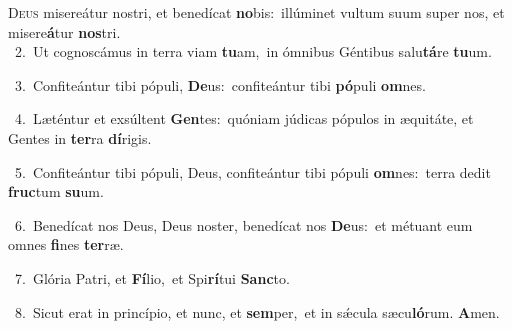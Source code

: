 \lettrine{\initial\textcolor{\initialcolor}{D}}{eus} misereátur nostri, et benedícat \textbf{no}\-bis:~\star illúminet vultum suum super nos, et misere\-\textbf{á}\-tur \textbf{nos}\-tri.\\
{\numbfont\textcolor{\numbcolor}{~2.}}~Ut cognoscámus in terra viam \textbf{tu}\-am,~\star in ómnibus Géntibus salu\-\textbf{tá}\-re \textbf{tu}\-um.\par
{\numbfont\textcolor{\numbcolor}{~3.}}~Confiteántur tibi pópuli, \textbf{De}\-us:~\star confiteántur tibi \textbf{pó}\-puli \textbf{om}\-nes.\par
{\numbfont\textcolor{\numbcolor}{~4.}}~Læténtur et exsúltent \textbf{Gen}\-tes:~\star quóniam júdicas pópulos in æquitáte, et Gentes in \textbf{ter}\-ra \textbf{dí}\-rigis.\par
{\numbfont\textcolor{\numbcolor}{~5.}}~Confiteántur tibi pópuli, Deus, confiteántur tibi pópuli \textbf{om}\-nes:~\star terra dedit \textbf{fruc}\-tum \textbf{su}\-um.\par
{\numbfont\textcolor{\numbcolor}{~6.}}~Benedícat nos Deus, Deus noster, benedícat nos \textbf{De}\-us:~\star et métuant eum omnes \textbf{fi}\-nes \textbf{ter}\-ræ.\par
{\numbfont\textcolor{\numbcolor}{~7.}}~Glória Patri, et \textbf{Fí}\-lio,~\star et Spi\-\textbf{rí}\-tui \textbf{Sanc}\-to.\par
{\numbfont\textcolor{\numbcolor}{~8.}}~Sicut erat in princípio, et nunc, et \textbf{sem}\-per,~\star et in sǽcula sæcu\-\textbf{ló}\-rum. \textbf{A}\-men.\par
